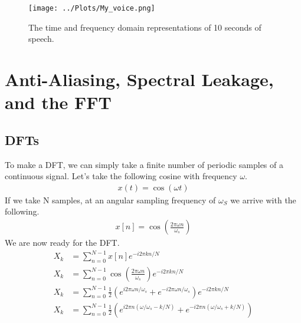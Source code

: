 \documentclass[twocolumn]{myarticle}
\begin{document}
\begin{figure*}[htb]
    \centering
    \texttt{[image: ../Plots/My\_voice.png]}
    \caption{The time and frequency domain representations of 10 seconds of speech.}
    \label{fig:my_voice}
\end{figure*}


\section{Anti-Aliasing, Spectral Leakage, and the FFT}
\label{sec:anti_aliasing_spectral_leakage_and_the_fft}

\subsection{DFTs}
\label{subsec:dfts}

To make a DFT, we can simply take a finite number of periodic samples of a continuous signal. 
Let's take the following cosine with frequency $\omega$.
\begin{align}
    x(t)=\cos\left(\omega t\right)
\end{align}
If we take N samples, at an angular sampling frequency of $\omega_{S}$ we arrive with the following.
\begin{align}
    x[n]=\cos\left( \frac{2 \pi \omega n}{\omega_{s}}\right)
\end{align}
We are now ready for the DFT.
\begin{align}
    X_{k} &= \sum^{N-1}_{n=0}x[n]e^{-i 2\pi k n/N} 
    \\
    X_{k} &= \sum^{N-1}_{n=0}\cos\left(\frac{2 \pi \omega n}{\omega_{s}}\right) e^{-i 2\pi kn/N}
    \\
    X_{k} &= \sum^{N-1}_{n=0} \frac{1}{2} \left( e^{i 2 \pi \omega n / \omega_s} + e^{-i 2 \pi \omega n / \omega_s} \right) e^{-i 2\pi kn/N}
    \\
    X_{k} &= \sum^{N-1}_{n=0} \frac{1}{2} \left( e^{i 2 \pi n (\omega/\omega_s - k/N)} + e^{-i 2 \pi n (\omega / \omega_s + k/N)} \right)
\end{align}
\end{document}
